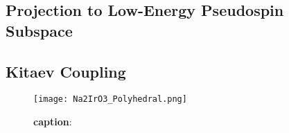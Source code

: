\documentclass[10pt,nofootinbib]{revtex4}
\begin{document}
	\subsection{Projection to Low-Energy Pseudospin Subspace}

	\subsection{Kitaev Coupling}
		\begin{figure}[!htp]
			\centering
			\texttt{[image: Na2IrO3\_Polyhedral.png]}
			\caption{{\bf caption}:}
			\label{fig:Na2IrO3}
		\end{figure}
		

\end{document}
